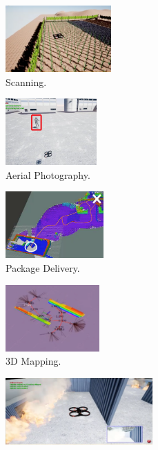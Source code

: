 \begin{figure}[t]
	\centering
	\begin{subfigure}[t]{1.385in}
		\centering
		\includegraphics[width=\textwidth, height=1in]{figs/benchmarks/scanning}
		\caption{Scanning.}\label{fig:benchmarks:scanning}
	\end{subfigure}
	\hfill
	\begin{subfigure}[t]{1.385in}
		\centering
		\includegraphics[width=\textwidth, height=1in]{figs/benchmarks/aerial-photo}
		\caption{Aerial Photography.}\label{fig:benchmarks:aerial-photo}
	\end{subfigure}
	\hfill
    \begin{subfigure}[t]{1.385in}
		\centering
		\includegraphics[width=\textwidth, height=1in]{figs/benchmarks/package-delivery}
		\caption{Package Delivery.}\label{fig:benchmarks:package-delivery}
	\end{subfigure}
	\hfill
    \begin{subfigure}[t]{1.385in}
		\centering
		\includegraphics[width=\textwidth, height=1in]{figs/benchmarks/3d-mapping}
		\caption{3D Mapping.}\label{fig:benchmarks:3D-mapping}
	\end{subfigure}
	\hfill
    \begin{subfigure}[t]{1.385in}
		\centering
		\includegraphics[width=\textwidth, height=1in]{figs/benchmarks/search-and-rescue}

\end{subfigure}
\end{figure}
